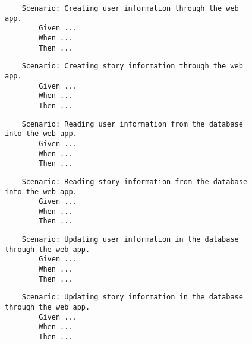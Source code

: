 \begin{figure}[!htbp]
    \centering
    \begin{verbatim}
    Scenario: Creating user information through the web app.
        Given ...
        When ...
        Then ...
    \end{verbatim}
    \label{fig:create-user-data}
\end{figure}

\begin{figure}[!htbp]
    \centering
    \begin{verbatim}
    Scenario: Creating story information through the web app.
        Given ...
        When ...
        Then ...
    \end{verbatim}
    \label{fig:create-story-data}
\end{figure}

\begin{figure}[!htbp]
    \centering
    \begin{verbatim}
    Scenario: Reading user information from the database into the web app.
        Given ...
        When ...
        Then ...
    \end{verbatim}
    \label{fig:read-user-data}
\end{figure}

\begin{figure}[!htbp]
    \centering
    \begin{verbatim}
    Scenario: Reading story information from the database into the web app.
        Given ...
        When ...
        Then ...
    \end{verbatim}
    \label{fig:read-story-data}
\end{figure}

\begin{figure}[!htbp]
    \centering
    \begin{verbatim}
    Scenario: Updating user information in the database through the web app.
        Given ...
        When ...
        Then ...
    \end{verbatim}
    \label{fig:update-user-data}
\end{figure}

\begin{figure}[!htbp]
    \centering
    \begin{verbatim}
    Scenario: Updating story information in the database through the web app.
        Given ...
        When ...
        Then ...
    \end{verbatim}
    \label{fig:update-story-data}
\end{figure}

